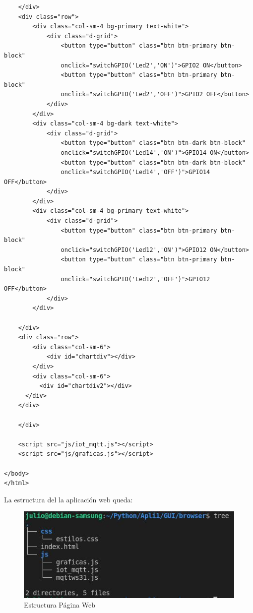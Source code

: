 \documentclass[oneside]{article}
\begin{document}
\begin{lstlisting}
    </div>
    <div class="row">
        <div class="col-sm-4 bg-primary text-white">
            <div class="d-grid">
                <button type="button" class="btn btn-primary btn-block"
                onclick="switchGPIO('Led2','ON')">GPIO2 ON</button>
                <button type="button" class="btn btn-primary btn-block"
                onclick="switchGPIO('Led2','OFF')">GPIO2 OFF</button>
            </div>
        </div>
        <div class="col-sm-4 bg-dark text-white">
            <div class="d-grid">
                <button type="button" class="btn btn-dark btn-block"
                onclick="switchGPIO('Led14','ON')">GPIO14 ON</button>
                <button type="button" class="btn btn-dark btn-block"
                onclick="switchGPIO('Led14','OFF')">GPIO14 OFF</button>
            </div>
        </div>
        <div class="col-sm-4 bg-primary text-white">
            <div class="d-grid">
                <button type="button" class="btn btn-primary btn-block"
                onclick="switchGPIO('Led12','ON')">GPIO12 ON</button>
                <button type="button" class="btn btn-primary btn-block"
                onclick="switchGPIO('Led12','OFF')">GPIO12 OFF</button>
            </div>
        </div>
        
    </div>
    <div class="row">
        <div class="col-sm-6">
            <div id="chartdiv"></div>
        </div>
        <div class="col-sm-6">
          <div id="chartdiv2"></div>
      </div>
    </div>

    </div>
       
    <script src="js/iot_mqtt.js"></script>
    <script src="js/graficas.js"></script>

</body>
</html>
\end{lstlisting}

La estructura del la aplicación web queda:
\begin{figure}[H]
\centering
\includegraphics[scale=0.75]{images/estructura.jpg}
\caption{Estructura Página Web}
\end{figure}
\end{document}
